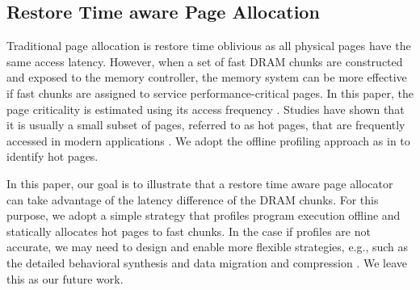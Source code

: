 \subsection{Restore Time aware Page Allocation}
\label{subsec:page_alloc}
Traditional page allocation is restore time oblivious as all physical pages have the same access latency. However, when a set of fast DRAM chunks are constructed and exposed to the memory controller, %
the memory system can be more effective if fast chunks are assigned to service performance-critical pages. In this paper, the page criticality is estimated using its access frequency \cite{ISCA13:charm,TC01:alloc}. Studies have shown that it is usually a small subset of pages, referred to as hot pages, that are frequently accessed in modern applications \cite{ISCA09:hot_page,ICS11:hot_page,TODAES13:hot_page}. We adopt the offline profiling approach as in \cite{ISCA13:charm} to identify hot pages.




In this paper, our goal is to illustrate that a restore time aware page allocator can take advantage of the latency difference of the DRAM chunks. For this purpose, we adopt a simple strategy that profiles program execution offline and statically allocates hot pages to fast chunks. 
In the case if profiles are not accurate, we may need to design and enable more flexible strategies, e.g., such as the detailed behavioral synthesis \cite{TODAES11:partition} 
and data migration and compression \cite{TODAES08:bankmem}. We leave this as our future work. 

